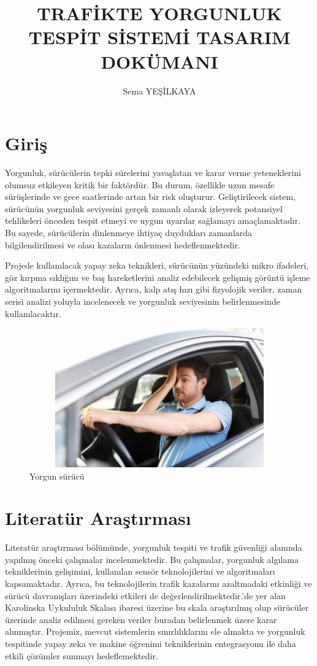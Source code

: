 \documentclass[12pt, a4paper]{report}
\title{TRAFİKTE YORGUNLUK TESPİT SİSTEMİ TASARIM DOKÜMANI}
\author{Sema YEŞİLKAYA}
\begin{document}
\maketitle
\tableofcontents{} \newpage
\section{Giriş}
Yorgunluk, sürücülerin tepki sürelerini yavaşlatan ve karar verme yeteneklerini olumsuz etkileyen kritik bir faktördür. Bu durum, özellikle uzun mesafe sürüşlerinde ve gece saatlerinde artan bir risk oluşturur. Geliştirilecek sistem, sürücünün yorgunluk seviyesini gerçek zamanlı olarak izleyerek potansiyel tehlikeleri önceden tespit etmeyi ve uygun uyarılar sağlamayı amaçlamaktadır. Bu sayede, sürücülerin dinlenmeye ihtiyaç duydukları zamanlarda bilgilendirilmesi ve olası kazaların önlenmesi hedeflenmektedir.

Projede kullanılacak yapay zeka teknikleri, sürücünün yüzündeki mikro ifadeleri, göz kırpma sıklığını ve baş hareketlerini analiz edebilecek gelişmiş görüntü işleme algoritmalarını içermektedir. Ayrıca, kalp atış hızı gibi fizyolojik veriler, zaman serisi analizi yoluyla incelenecek ve yorgunluk seviyesinin belirlenmesinde kullanılacaktır. 
\begin{figure}[!h]
	\centering
	\includegraphics[width=17cm, height=6cm, keepaspectratio]{yorgunluk.png}
	\caption{Yorgun sürücü}
\end{figure}
\section{Literatür Araştırması}
Literatür araştırması bölümünde, yorgunluk tespiti ve trafik güvenliği alanında yapılmış önceki çalışmalar incelenmektedir. Bu çalışmalar, yorgunluk algılama tekniklerinin gelişimini, kullanılan sensör teknolojilerini ve algoritmaları kapsamaktadır. Ayrıca, bu teknolojilerin trafik kazalarını azaltmadaki etkinliği ve sürücü davranışları üzerindeki etkileri de değerlendirilmektedir.\cite{vural2018gercek}'de yer alan Karolinska Uykululuk Skalası ibaresi üzerine bu skala araştırılmış olup sürücüler üzerinde analiz edilmesi gereken veriler buradan belirlenmek üzere karar alınmıştır. Projemiz, mevcut sistemlerin sınırlılıklarını ele almakta ve yorgunluk tespitinde yapay zeka ve makine öğrenimi tekniklerinin entegrasyonu ile daha etkili çözümler sunmayı hedeflemektedir.\newpage
\end{document}

